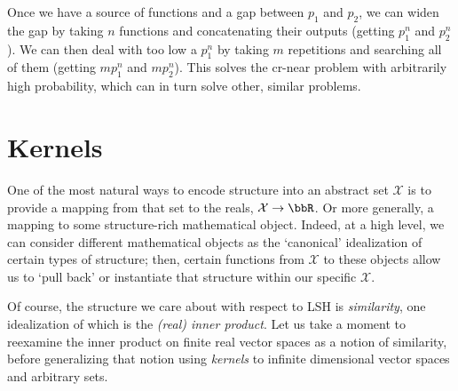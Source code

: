 \documentclass[twoside,11pt]{homework}
\begin{document}
\begin{multicols}{2}
Once we have a source of functions and a gap between $p_1$ and $p_2$,
we can widen the gap by taking $n$ functions and concatenating their
outputs (getting $p_1^n$ and $p_2^n$).  We can then deal with too low
a $p_1^n$ by taking $m$ repetitions and searching all of them (getting
$mp_1^n$ and $mp_2^n$).  This solves the cr-near problem with
arbitrarily high probability, which can in turn solve other, similar
problems.


\section{Kernels} %

One of the most natural ways to encode structure into an abstract set $\mathcal{X}$ is to provide a mapping  from that set to the reals, $\mathcal{X} \to \bbR$. Or more generally, a mapping to some structure-rich mathematical object. Indeed, at a high level, we can consider different mathematical objects as the `canonical' idealization of certain types of structure; then, certain functions from $\mathcal{X}$ to these objects allow us to `pull back' or instantiate that structure within our specific $\mathcal{X}$.

Of course, the structure we care about with respect to LSH is \emph{similarity}, one idealization of which is the \emph{(real) inner product}. Let us take a moment to reexamine the inner product on finite real vector spaces as a notion of similarity, before generalizing that notion using \emph{kernels} to infinite dimensional vector spaces and arbitrary sets.


\end{multicols}
\end{document}
